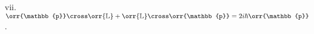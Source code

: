 \documentclass{article}
\begin{document}
{\begin{enumerate}
\begin{enumerate}
				\paragraph{Solution} \unboldmath
				\begin{equation*}
					\begin{split}
						\orr{\mathbb{L}} \cross \orr{\mathbb{L}} &= -\left( \orr{L} \cross \orr{L} \right) + \epsilon_{ijk} \left[ L_j , L_k \right] \\
						\left( \orr{L} \cross \orr{L} \right)_i &= -\left( \orr{L} \cross \orr{L} \right)_i + \epsilon_{ijk} \left( i\hbar \epsilon_{jkl} L_l \right) \\
						2\left( \orr{L} \cross \orr{L} \right)_i &= i\hbar 2\delta_{il} L_l \\
						\left( \orr{L} \cross \orr{L} \right)_i &= i\hbar L_i \\
						\orr{L} \cross \orr{L} &= i\hbar \orr{L} \\
					\end{split}
				\end{equation*} \boldmath
				\item[vii.] $ \orr{\mathbb{p}} \cross \orr{\mathbb{L}} + \orr{\mathbb{L}} \cross \orr{\mathbb{p}} = 2i\hbar \orr{\mathbb{p}} $.

\end{enumerate}
\end{enumerate}}
\end{document}
